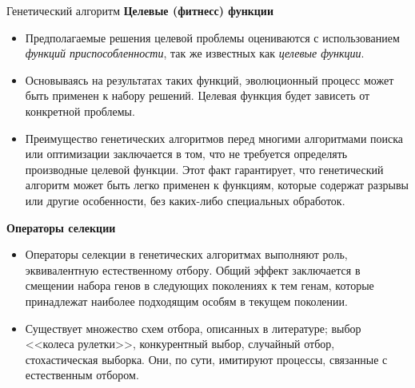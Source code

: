 \documentclass[aspectratio=169, mathserif]{beamer}	%
\begin{document}
\begin{frame}[fragile]{Генетический алгоритм}
\scriptsize
\alert{\textbf{Целевые (фитнесс) функции}}
\begin{itemize}
	\item Предполагаемые решения целевой проблемы оцениваются с использованием \textcolor{extraorange}{\textit{функций приспособленности}}, так же известных как \textcolor{extraorange}{\textit{целевые функции}}.
	\item Основываясь на результатах таких функций, эволюционный процесс может быть применен к набору решений. Целевая функция будет зависеть от конкретной проблемы.
	\item Преимущество генетических алгоритмов перед многими алгоритмами поиска или оптимизации заключается в том, что не требуется определять производные целевой функции. Этот факт гарантирует, что генетический алгоритм может быть легко применен к функциям, которые содержат разрывы или другие  особенности, без каких-либо специальных обработок.
\end{itemize}
\alert{\textbf{Операторы селекции}}
\begin{itemize}
	\item Операторы селекции в генетических алгоритмах выполняют роль, эквивалентную естественному отбору. Общий эффект заключается в смещении набора генов в следующих поколениях к тем генам, которые принадлежат наиболее подходящим особям в текущем поколении.

	\item Существует множество схем отбора, описанных в литературе; выбор <<колеса рулетки>>, конкурентный выбор, случайный отбор, стохастическая выборка. Они, по сути, имитируют процессы, связанные с естественным отбором.
\end{itemize}
\vfill
\end{frame}
\end{document}
